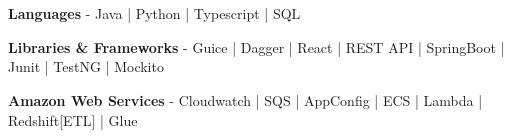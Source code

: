 \newcommand{\skillItem}[2]{
    \textbf{#1} - #2 \\ \vspace{0.2cm}
}

\section{}

\skillItem{Languages}{Java | Python | Typescript | SQL}
\skillItem{Libraries \& Frameworks}{Guice | Dagger | React |  REST API | SpringBoot | Junit | TestNG | Mockito}
\skillItem{Amazon Web Services}{Cloudwatch | SQS | AppConfig | ECS | Lambda | Redshift[ETL] | Glue}
